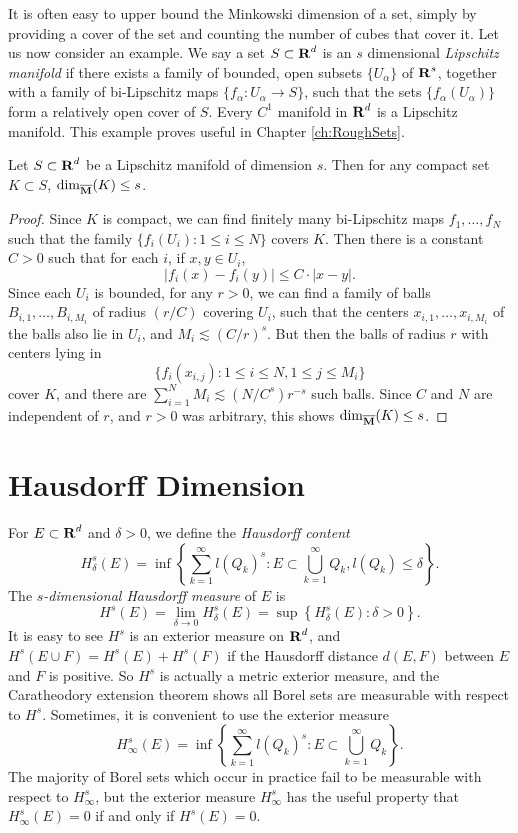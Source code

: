 It is often easy to upper bound the Minkowski dimension of a set, simply by providing a cover of the set and counting the number of cubes that cover it. Let us now consider an example. We say a set $S \subset \operatorname{\mathbf{R}}^d$ is an $s$ dimensional \emph{Lipschitz manifold} if there exists a family of bounded, open subsets $\{ U_\alpha \}$ of $\operatorname{\mathbf{R}}^s$, together with a family of bi-Lipschitz maps $\{ f_\alpha: U_\alpha \to S \}$, such that the sets $\{ f_\alpha(U_\alpha) \}$ form a relatively open cover of $S$. Every $C^1$ manifold in $\operatorname{\mathbf{R}}^d$ is a Lipschitz manifold. This example proves useful in Chapter \ref{ch:RoughSets}.

\begin{theorem} \label{ManifoldDimensionThm}
	Let $S \subset \operatorname{\mathbf{R}}^d$ be a Lipschitz manifold of dimension $s$. Then for any compact set $K \subset S$, $\operatorname{\dim_{\overline{\mathbf{M}}}}(K) \leq s$.
\end{theorem}
\begin{proof}
	Since $K$ is compact, we can find finitely many bi-Lipschitz maps $f_1, \dots, f_N$ such that the family $\{ f_i(U_i) : 1 \leq i \leq N \}$ covers $K$. Then there is a constant $C > 0$ such that for each $i$, if $x,y \in U_i$,
	\[ |f_i(x) - f_i(y)| \leq C \cdot |x-y|. \]
	Since each $U_i$ is bounded, for any $r > 0$, we can find a family of balls $B_{i,1}, \dots, B_{i,M_i}$ of radius $(r/C)$ covering $U_i$, such that the centers $x_{i,1}, \dots, x_{i,M_i}$ of the balls also lie in $U_i$, and $M_i \lesssim (C/r)^s$. But then the balls of radius $r$ with centers lying in
	\[ \{ f_i(x_{i,j}) : 1 \leq i \leq N, 1 \leq j \leq M_i \} \]
	cover $K$, and there are $\sum_{i = 1}^N M_i \lesssim (N/C^s) r^{-s}$ such balls. Since $C$ and $N$ are independent of $r$, and $r > 0$ was arbitrary, this shows $\operatorname{\dim_{\overline{\mathbf{M}}}}(K) \leq s$.
\end{proof}

\section{Hausdorff Dimension}

For $E \subset \operatorname{\mathbf{R}}^d$ and $\delta > 0$, we define the \emph{Hausdorff content}
%
\[ H_\delta^s(E) = \inf \left\{ \sum_{k = 1}^\infty l(Q_k)^s : E \subset \bigcup_{k = 1}^\infty Q_k, l(Q_k) \leq \delta \right\}. \]
%
The \emph{$s$-dimensional Hausdorff measure} of $E$ is
%
\[ H^s(E) = \lim_{\delta \to 0} H_\delta^s(E) = \sup \left\{ H^s_\delta(E) : \delta > 0 \right\}. \]
%
It is easy to see $H^s$ is an exterior measure on $\operatorname{\mathbf{R}}^d$, and $H^s(E \cup F) = H^s(E) + H^s(F)$ if the Hausdorff distance $d(E,F)$ between $E$ and $F$ is positive. So $H^s$ is actually a metric exterior measure, and the Caratheodory extension theorem shows all Borel sets are measurable with respect to $H^s$. Sometimes, it is convenient to use the exterior measure
%
\[ H^s_\infty(E) = \inf \left\{ \sum_{k = 1}^\infty l(Q_k)^s : E \subset \bigcup_{k = 1}^\infty Q_k \right\}. \]
%
The majority of Borel sets which occur in practice fail to be measurable with respect to $H^s_\infty$, but the exterior measure $H^s_\infty$ has the useful property that $H^s_\infty(E) = 0$ if and only if $H^s(E) = 0$.

